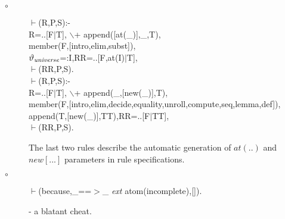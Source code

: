 \documentclass[11pt]{report}
\begin{document}
\begin{description}
 \item[$\circ$]
\begin{sf}\begin{tabbing}
$\vdash$(R,P,S):-\\[-0.15ex]
\hspace{2em}R=..[F$\mid$T], $\backslash$+ append([at(\_\hspace{0.1em})],\_\hspace{0.1em},T),\\[-0.15ex]
\hspace{2em}member(F,[intro,elim,subst]),\\[-0.15ex]
\hspace{2em}$\vartheta_{\it universe}$=:I,RR=..[F,at(I)$\mid$T],\\[-0.15ex]
\hspace{2em}$\vdash$(RR,P,S).\\[-0.15ex]
$\vdash$(R,P,S):-\\[-0.15ex]
\hspace{2em}R=..[F$\mid$T], $\backslash$+ append(\_\hspace{0.1em},[new(\_\hspace{0.1em})],T),\\[-0.15ex]
\hspace{2em}member(F,[intro,elim,decide,equality,unroll,compute,seq,lemma,def]),\\[-0.15ex]
\hspace{2em}append(T,[new(\_\hspace{0.1em})],TT),RR=..[F$\mid$TT],\\[-0.15ex]
\hspace{2em}$\vdash$(RR,P,S).\\[-0.7ex]

\end{tabbing}\end{sf}

 The last two rules describe the automatic generation of $at(..)$
 and $new[...]$ parameters in rule specifications.
 \item[$\circ$]
 
\begin{sf}\begin{tabbing}
$\vdash$(because,\_\hspace{0.1em}==$>$\_\hspace{0.1em} \mbox{\it ext} atom(incomplete),[]).
\end{tabbing}\end{sf}

 
  - a blatant cheat.
 

\end{description}
\end{document}
